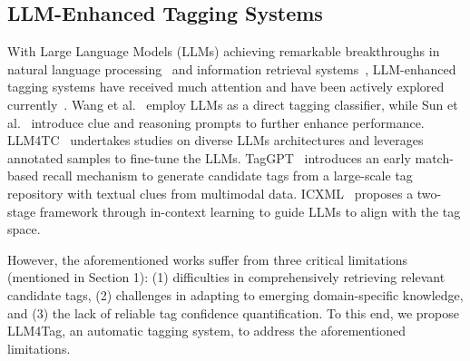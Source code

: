 \subsection{LLM-Enhanced Tagging Systems}
With Large Language Models (LLMs) achieving remarkable breakthroughs in natural language processing~\cite{achiam2023gpt,touvron2023llama,guo2025deepseek,brown2020language} and information retrieval systems~\cite{zhu2023large,lin2023can}, LLM-enhanced tagging systems have received much attention and have been actively explored currently~\cite{wang2023large,sun2023text,chae2023large,li2023taggpt,zhu2023icxml}.
Wang et al.~\cite{wang2023large} employ LLMs as a direct tagging classifier, while Sun et al.~\cite{sun2023text} introduce clue and reasoning prompts to further enhance performance. LLM4TC~\cite{chae2023large} undertakes studies on diverse LLMs architectures and leverages annotated samples to fine-tune the LLMs. TagGPT~\cite{li2023taggpt} introduces an early match-based recall mechanism to generate candidate tags from a large-scale tag 
repository with textual clues from multimodal data. ICXML~\cite{zhu2023icxml} proposes a two-stage framework through in-context learning to guide LLMs to align with the tag space.

However, the aforementioned works suffer from three critical limitations (mentioned in Section 1): (1) difficulties in comprehensively retrieving relevant candidate tags, (2) challenges in adapting to emerging domain-specific knowledge, and (3) the lack of reliable tag confidence quantification. %
To this end, we propose LLM4Tag, an automatic tagging system, to address the aforementioned limitations.




